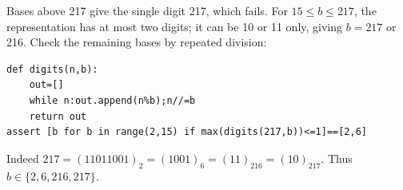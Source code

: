 Bases above 217 give the single digit 217, which fails. For $ 15\le b\le217 $, the representation has at most two digits; it can be 10 or 11 only, giving $ b=217 $ or 216. Check the remaining bases by repeated division:
\begin{verbatim}
def digits(n,b):
    out=[]
    while n:out.append(n%b);n//=b
    return out
assert [b for b in range(2,15) if max(digits(217,b))<=1]==[2,6]
\end{verbatim}
Indeed $ 217=(11011001)_2=(1001)_6=(11)_{216}=(10)_{217}$. Thus $\boxed{b\in\{2,6,216,217\}}$.
